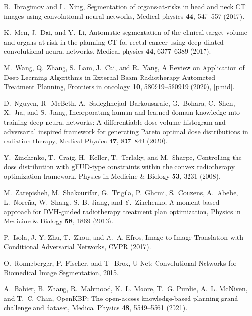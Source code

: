 \documentclass[10pt]{article}
\begin{document}
\begin{thebibliography}{10}
B.~Ibragimov and L.~Xing,
\newblock Segmentation of organs-at-risks in head and neck CT images using
  convolutional neural networks,
\newblock Medical physics {\bf 44}, 547--557 (2017).

K.~Men, J.~Dai, and Y.~Li,
\newblock Automatic segmentation of the clinical target volume and organs at
  risk in the planning CT for rectal cancer using deep dilated convolutional
  neural networks,
\newblock Medical physics {\bf 44}, 6377--6389 (2017).

M.~Wang, Q.~Zhang, S.~Lam, J.~Cai, and R.~Yang,
\newblock A Review on Application of Deep Learning Algorithms in External Beam
  Radiotherapy Automated Treatment Planning,
\newblock Frontiers in oncology {\bf 10}, 580919--580919 (2020),
[pmid].

D.~Nguyen, R.~McBeth, A.~Sadeghnejad~Barkousaraie, G.~Bohara, C.~Shen, X.~Jia,
  and S.~Jiang,
\newblock Incorporating human and learned domain knowledge into training deep
  neural networks: A differentiable dose-volume histogram and adversarial
  inspired framework for generating Pareto optimal dose distributions in
  radiation therapy,
\newblock Medical Physics {\bf 47}, 837--849 (2020).

Y.~Zinchenko, T.~Craig, H.~Keller, T.~Terlaky, and M.~Sharpe,
\newblock Controlling the dose distribution with gEUD-type constraints within
  the convex radiotherapy optimization framework,
\newblock Physics in Medicine \& Biology {\bf 53}, 3231 (2008).

M.~Zarepisheh, M.~Shakourifar, G.~Trigila, P.~Ghomi, S.~Couzens, A.~Abebe,
  L.~Nore{\~n}a, W.~Shang, S.~B. Jiang, and Y.~Zinchenko,
\newblock A moment-based approach for DVH-guided radiotherapy treatment plan
  optimization,
\newblock Physics in Medicine \& Biology {\bf 58}, 1869 (2013).

P.~Isola, J.-Y. Zhu, T.~Zhou, and A.~A. Efros,
\newblock Image-to-Image Translation with Conditional Adversarial Networks,
\newblock CVPR  (2017).

O.~Ronneberger, P.~Fischer, and T.~Brox,
\newblock U-Net: Convolutional Networks for Biomedical Image Segmentation,
  2015.

A.~Babier, B.~Zhang, R.~Mahmood, K.~L. Moore, T.~G. Purdie, A.~L. McNiven, and
  T.~C. Chan,
\newblock OpenKBP: The open-access knowledge-based planning grand challenge and
  dataset,
\newblock Medical Physics {\bf 48}, 5549--5561 (2021).


\end{thebibliography}
\end{document}
